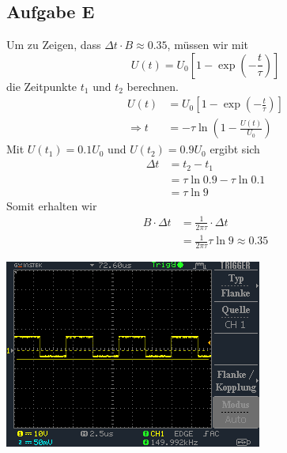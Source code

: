 \documentclass[10pt]{article}
\newenvironment{Figure}
  {\par\medskip\noindent\minipage{\linewidth}}
  {\endminipage\par\medskip}
\begin{document}
\begin{multicols}{2}
	\subsection{Aufgabe E}
	Um zu Zeigen, dass \(\Delta t \cdot B \approx 0.35\), müssen wir mit \[U(t)=U_0 \left[1 - \exp{(-\frac{t}{\tau})}\right]\] die Zeitpunkte \(t_1\) und \(t_2\) berechnen.
	\begin{align}
		U(t)          & = U_0\left[1-\exp{(-\frac{t}{\tau})}\right]\\
		\Rightarrow t & =-\tau\ln{\left(1-\frac{U(t)}{U_0}\right)}
	\end{align}
Mit \(U(t_1)=0.1U_0\) und \(U(t_2) = 0.9U_0\) ergibt sich
\begin{align}
  \Delta t &= t_2 - t_1 \\
           &= \tau\ln{0.9} - \tau\ln{0.1}\\
           &= \tau\ln{9}
\end{align}
Somit erhalten wir
\begin{align}
  B\cdot\Delta t &= \frac{1}{2\pi\tau} \cdot \Delta t\\
  &= \frac{1}{2\pi\tau}\tau\ln{9}\approx 0.35
\end{align}
	\begin{Figure}
		\centering
		\includegraphics[width=0.9\linewidth]{DS0000.BMP}
		\label{fig:1.5}
	\end{Figure}

\end{multicols}
\end{document}
